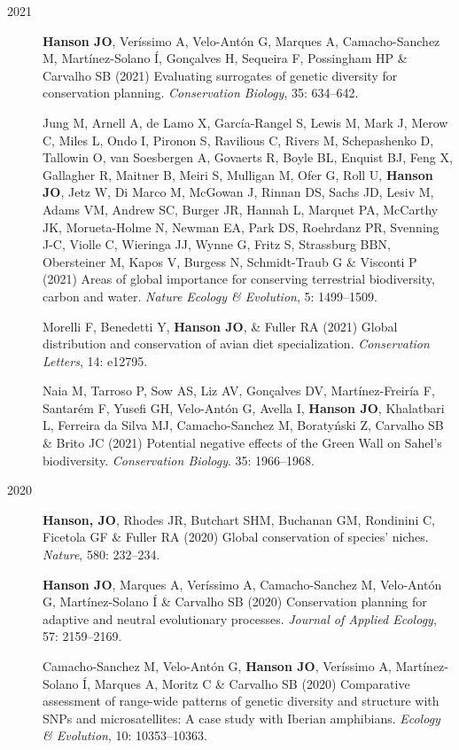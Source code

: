 \documentclass[12pt,a4paper]{article}
\begin{document}
\begin{description}
\item[2021] \textbf{Hanson JO}, Veríssimo A, Velo-Antón G, Marques A, Camacho-Sanchez M, Martínez-Solano Í, Gonçalves H, Sequeira F, Possingham HP \& Carvalho SB (2021) Evaluating surrogates of genetic diversity for conservation planning. \textit{Conservation Biology}, 35: 634--642.

\item[] Jung M, Arnell A, de Lamo X, García-Rangel S, Lewis M, Mark J, Merow C, Miles L, Ondo I, Pironon S, Ravilious C, Rivers M, Schepashenko D, Tallowin O, van Soesbergen A, Govaerts R, Boyle BL, Enquist BJ, Feng X, Gallagher R, Maitner B, Meiri S, Mulligan M, Ofer G, Roll U, \textbf{Hanson JO}, Jetz W, Di Marco M, McGowan J, Rinnan DS, Sachs JD, Lesiv M, Adams VM, Andrew SC, Burger JR, Hannah L, Marquet PA, McCarthy JK, Morueta-Holme N, Newman EA, Park DS, Roehrdanz PR, Svenning J-C, Violle C, Wieringa JJ, Wynne G, Fritz S, Strassburg BBN, Obersteiner M, Kapos V, Burgess N, Schmidt-Traub G \& Visconti P (2021) Areas of global importance for conserving terrestrial biodiversity, carbon and water. \textit{Nature Ecology \& Evolution}, 5: 1499--1509.

\item[] Morelli F, Benedetti Y, \textbf{Hanson JO}, \& Fuller RA (2021) Global distribution and conservation of avian diet specialization. \textit{Conservation Letters}, 14: e12795.

\item[] Naia M, Tarroso P, Sow AS, Liz AV, Gonçalves DV, Martínez-Freiría F, Santarém F, Yusefi GH, Velo-Antón G, Avella I, \textbf{Hanson JO}, Khalatbari L, Ferreira da Silva MJ, Camacho-Sanchez M, Boratyński Z, Carvalho SB \& Brito JC (2021) Potential negative effects of the Green Wall on Sahel's biodiversity. \textit{Conservation Biology}. 35: 1966--1968.

\item[2020] \textbf{Hanson, JO}, Rhodes JR, Butchart SHM, Buchanan GM, Rondinini C, Ficetola GF \& Fuller RA (2020) Global conservation of species' niches. \textit{Nature}, 580: 232--234.

\item[] \textbf{Hanson JO}, Marques A, Veríssimo A, Camacho-Sanchez M, Velo-Antón G, Martínez-Solano Í \& Carvalho SB (2020) Conservation planning for adaptive and neutral evolutionary processes. \textit{Journal of Applied Ecology}, 57: 2159--2169.

\item[] Camacho-Sanchez M, Velo-Antón G, \textbf{Hanson JO}, Veríssimo A, Martínez-Solano Í, Marques A, Moritz C \& Carvalho SB (2020) Comparative assessment of range-wide patterns of genetic diversity and structure with SNPs and microsatellites: A case study with Iberian amphibians. \textit{Ecology \& Evolution}, 10: 10353--10363.


\end{description}
\end{document}

